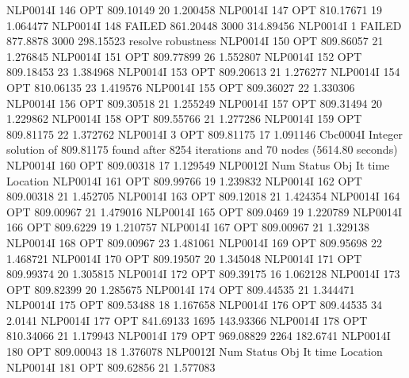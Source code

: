 NLP0014I           146         OPT 809.10149       20 1.200458
NLP0014I           147         OPT 810.17671       19 1.064477
NLP0014I           148      FAILED 861.20448     3000 314.89456
NLP0014I             1      FAILED 877.8878     3000 298.15523   resolve robustness
NLP0014I           150         OPT 809.86057       21 1.276845
NLP0014I           151         OPT 809.77899       26 1.552807
NLP0014I           152         OPT 809.18453       23 1.384968
NLP0014I           153         OPT 809.20613       21 1.276277
NLP0014I           154         OPT 810.06135       23 1.419576
NLP0014I           155         OPT 809.36027       22 1.330306
NLP0014I           156         OPT 809.30518       21 1.255249
NLP0014I           157         OPT 809.31494       20 1.229862
NLP0014I           158         OPT 809.55766       21 1.277286
NLP0014I           159         OPT 809.81175       22 1.372762
NLP0014I             3         OPT 809.81175       17 1.091146
Cbc0004I Integer solution of 809.81175 found after 8254 iterations and 70 nodes (5614.80 seconds)
NLP0014I           160         OPT 809.00318       17 1.129549
NLP0012I 
              Num      Status      Obj             It       time                 Location
NLP0014I           161         OPT 809.99766       19 1.239832
NLP0014I           162         OPT 809.00318       21 1.452705
NLP0014I           163         OPT 809.12018       21 1.424354
NLP0014I           164         OPT 809.00967       21 1.479016
NLP0014I           165         OPT 809.0469       19 1.220789
NLP0014I           166         OPT 809.6229       19 1.210757
NLP0014I           167         OPT 809.00967       21 1.329138
NLP0014I           168         OPT 809.00967       23 1.481061
NLP0014I           169         OPT 809.95698       22 1.468721
NLP0014I           170         OPT 809.19507       20 1.345048
NLP0014I           171         OPT 809.99374       20 1.305815
NLP0014I           172         OPT 809.39175       16 1.062128
NLP0014I           173         OPT 809.82399       20 1.285675
NLP0014I           174         OPT 809.44535       21 1.344471
NLP0014I           175         OPT 809.53488       18 1.167658
NLP0014I           176         OPT 809.44535       34 2.0141
NLP0014I           177         OPT 841.69133     1695 143.93366
NLP0014I           178         OPT 810.34066       21 1.179943
NLP0014I           179         OPT 969.08829     2264 182.6741
NLP0014I           180         OPT 809.00043       18 1.376078
NLP0012I 
              Num      Status      Obj             It       time                 Location
NLP0014I           181         OPT 809.62856       21 1.577083
